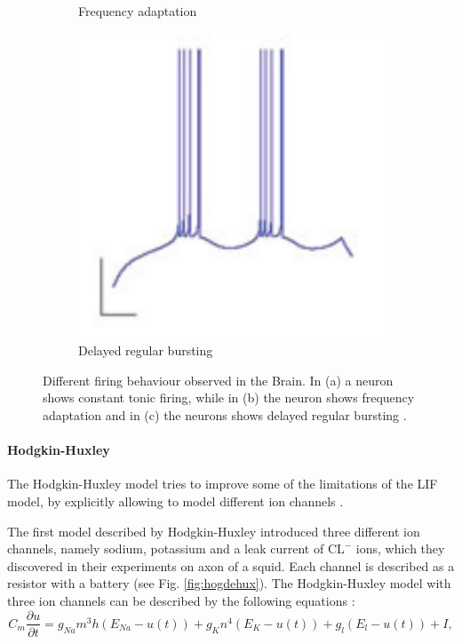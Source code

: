 \begin{figure}
\begin{subfigure}[t]{.32\textwidth}
  		\caption{Frequency adaptation}
	\end{subfigure}
	\begin{subfigure}[t]{.32\textwidth}
	 	\centering
  		\includegraphics[width=.9\linewidth]{imgs/lif_bad3.png}
  		\caption{Delayed regular bursting}
	\end{subfigure}
    \caption{Different firing behaviour observed in the Brain. In (a) a neuron shows constant tonic firing, while in (b) the neuron shows frequency adaptation and in (c) the neurons shows delayed regular bursting \cite{gerstner2014neuronal}.}
	\label{fig:neuronbe}
\end{figure}



\paragraph{Hodgkin-Huxley} \label{c:hodghux}

The Hodgkin-Huxley model tries to improve some of the limitations of the LIF model, by explicitly allowing to model different ion channels \cite{Hodgkin1952}\cite{gerstner2014neuronal}. 

The first model described by Hodgkin-Huxley introduced three different ion channels, namely sodium, potassium and a leak current of $\text{CL}^{-}$ ions, which they discovered in their experiments on axon of a squid.
Each channel is described as a resistor with a battery (see Fig. \ref{fig:hogdehux}).
The Hodgkin-Huxley model with three ion channels can be described by the following equations :
\[
C_m \frac{\partial u}{\partial t} = g_{Na} m^3 h (E_{Na} - u(t)) + g_K n^4 (E_K - u(t)) + g_l (E_l - u(t)) + I,
\]

